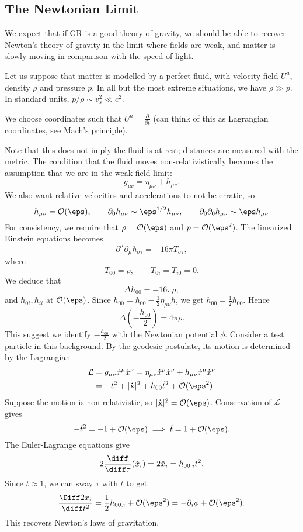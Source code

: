 \documentclass[12pt]{article}
\begin{document}
\subsection{The Newtonian Limit}%
\label{sub:tnl}

We expect that if GR is a good theory of gravity, we should be able to recover Newton's theory of gravity in the limit where fields are weak, and matter is slowly moving in comparison with the speed of light.

Let us suppose that matter is modelled by a perfect fluid, with velocity field $U^a$, density $\rho$ and pressure $p$. In all but the most extreme situations, we have $\rho \gg p$. In standard units, $p/\rho \sim v_s^2 \ll c^2$.

We choose coordinates such that $U^a = \frac{\partial}{\partial t}$ (can think of this as Lagrangian coordinates, see Mach's principle).

Note that this does not imply the fluid is at rest; distances are measured with the metric. The condition that the fluid moves non-relativistically becomes the assumption that we are in the weak field limit:
\[
g_{\mu\nu} = \eta_{\mu\nu} + h_{\mu\nu}.
\]
We also want relative velocities and accelerations to not be erratic, so
\[
h_{\mu\nu} = \mathcal{O}(\eps), \qquad \partial_0 h_{\mu\nu} \sim \eps^{1/2} h_{\mu\nu}, \qquad \partial_0\partial_0 h_{\mu\nu} \sim \eps h_{\mu\nu}
\]
For consistency, we require that $\rho = \mathcal{O}(\eps)$ and $p = \mathcal{O}(\eps^2)$. The linearized Einstein equations becomes
\[
	\partial^\mu \partial_\mu \hbar_{\sigma\tau} = - 16 \pi T_{\sigma\tau},
\]
where
\[
T_{00} = \rho, \qquad T_{0i} = T_{i0} = 0.
\]
We deduce that
\[
\Delta \hbar_{00} = - 16 \pi \rho,
\]
and $\hbar_{0i}, \hbar_{ii}$ at $\mathcal{O}(\eps)$. Since $h_{00} = \hbar_{00} - \frac{1}{2} \eta_{\mu\nu} \hbar$, we get $h_{00} = \frac{1}{2} \hbar_{00}$. Hence
\[
\Delta \left( - \frac{h_{00}}{2} \right) = 4 \pi \rho.
\]
This suggest we identify $- \frac{h_{00}}{2}$ with the Newtonian potential $\phi$. Consider a test particle in this background. By the geodesic postulate, its motion is determined by the Lagrangian
\begin{align*}
	\mathcal{L} &= g_{\mu\nu} \dot x^\mu \dot x^\nu = \eta_{\mu\nu} \dot x^\mu \dot x^\nu + h_{\mu\nu} \dot x^\mu \dot x^\nu \\
		    &= - \dot t^2 + |\mathbf{\dot x}|^2 + h_{00} \dot t^2 + \mathcal{O}(\eps^2).
\end{align*}
Suppose the motion is non-relativistic, so $|\mathbf{\dot x}|^2 = \mathcal{O}(\eps)$. Conservation of $\mathcal{L}$ gives
\[
-\dot t^2 = -1 + \mathcal{O}(\eps) \implies \dot t = 1 + \mathcal{O}(\eps).
\]
The Euler-Lagrange equations give
\[
2\frac{\diff}{\diff \tau} (\dot x_i) = 2 \ddot x_i = h_{00,i} \dot t^2.
\]
Since $\dot t \approx 1$, we can sway $\tau$ with $t$ to get
\[
\frac{\Diff 2 x_i}{\diff t^2} = \frac{1}{2} h_{00, i} + \mathcal{O}(\eps^2) = - \partial_i \phi + \mathcal{O}(\eps^2).
\]
This recovers Newton's laws of gravitation.
\end{document}
